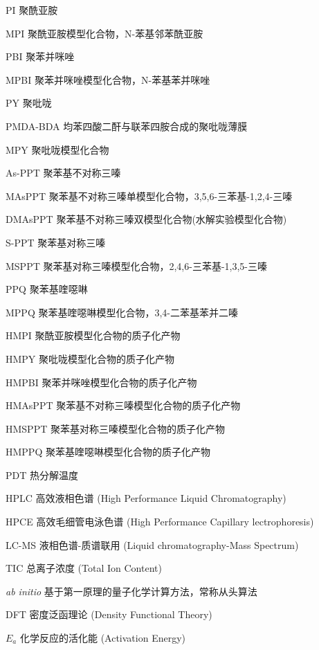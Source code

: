 \documentclass{thuthesis}
\begin{document}
\START
\showoutput

\frontmatter
\setcounter{page}{8}
\begin{denotation}[3cm]
  \item[PI] 聚酰亚胺
  \item[MPI] 聚酰亚胺模型化合物，N-苯基邻苯酰亚胺
  \item[PBI] 聚苯并咪唑
  \item[MPBI] 聚苯并咪唑模型化合物，N-苯基苯并咪唑
  \item[PY] 聚吡咙
  \item[PMDA-BDA] 均苯四酸二酐与联苯四胺合成的聚吡咙薄膜
  \item[MPY] 聚吡咙模型化合物
  \item[As-PPT] 聚苯基不对称三嗪
  \item[MAsPPT] 聚苯基不对称三嗪单模型化合物，3,5,6-三苯基-1,2,4-三嗪
  \item[DMAsPPT] 聚苯基不对称三嗪双模型化合物(水解实验模型化合物)
  \item[S-PPT] 聚苯基对称三嗪
  \item[MSPPT] 聚苯基对称三嗪模型化合物，2,4,6-三苯基-1,3,5-三嗪
  \item[PPQ] 聚苯基喹噁啉
  \item[MPPQ] 聚苯基喹噁啉模型化合物，3,4-二苯基苯并二嗪
  \item[HMPI] 聚酰亚胺模型化合物的质子化产物
  \item[HMPY] 聚吡咙模型化合物的质子化产物
  \item[HMPBI] 聚苯并咪唑模型化合物的质子化产物
  \item[HMAsPPT] 聚苯基不对称三嗪模型化合物的质子化产物
  \item[HMSPPT] 聚苯基对称三嗪模型化合物的质子化产物
  \item[HMPPQ] 聚苯基喹噁啉模型化合物的质子化产物
  \item[PDT] 热分解温度
  \item[HPLC] 高效液相色谱 (High Performance Liquid Chromatography)
  \item[HPCE] 高效毛细管电泳色谱 (High Performance Capillary lectrophoresis)
  \item[LC-MS] 液相色谱-质谱联用 (Liquid chromatography-Mass Spectrum)
  \item[TIC] 总离子浓度 (Total Ion Content)
  \item[\textit{ab initio}] 基于第一原理的量子化学计算方法，常称从头算法
  \item[DFT] 密度泛函理论 (Density Functional Theory)
  \item[$E_a$] 化学反应的活化能 (Activation Energy)

\end{denotation}
\end{document}
